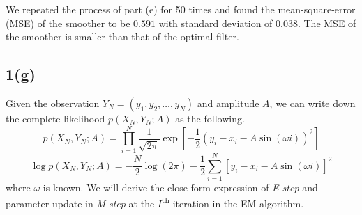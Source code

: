 \documentclass[a4paper, 11pt]{article}
\begin{document}
We repeated the process of part (e) for 50 times and found the mean-square-error (MSE) of the smoother to be $0.591$ with standard deviation of $0.038$. The MSE of the smoother is smaller than that of the optimal filter. 


\subsection*{1(g)}

Given the observation $Y_N = (y_1, y_2, \dots, y_N)$ and amplitude $A$, we can write down the complete likelihood $p(X_N, Y_N; A)$ as the following. 
\begin{equation}
p(X_N, Y_N; A) = \prod_{i=1}^N\frac{1}{\sqrt{2\pi}}\exp\left[-\frac{1}{2}(y_i - x_i - A\sin(\omega i))^2 \right]
\end{equation}
\begin{equation}
\log p(X_N, Y_N; A) = -\frac{N}{2}\log(2\pi) - \frac{1}{2}\sum_{i=1}^N\left[y_i-x_i-A\sin(\omega i) \right]^2
\end{equation}
where $\omega$ is known. We will derive the close-form expression of \textit{E-step} and parameter update in \textit{M-step} at the $I$\textsuperscript{th} iteration in the EM algorithm. 
\end{document}
